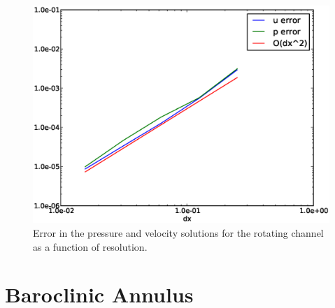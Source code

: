 \begin{figure}[ht]
  \centering
  \onlypdf{\begin{pdfdisplay}}
    \includegraphics[width=1.1\textwidth]{examples_images/rotating_channel/convergence.eps}
  \onlypdf{\end{pdfdisplay}}  
  \caption{Error in the pressure and velocity solutions for the rotating channel as a function of resolution.}
  \label{fig:periodic_channel_error}
\end{figure}


\section{Baroclinic Annulus}
\label{sect:annulus}

